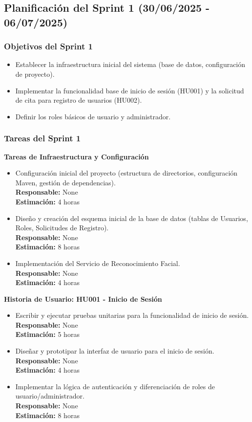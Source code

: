 \documentclass[12pt]{article}
\begin{document}
\subsection{Planificación del Sprint 1 (30/06/2025 - 06/07/2025)}

\subsubsection{Objetivos del Sprint 1}
\begin{itemize}
	\item Establecer la infraestructura inicial del sistema (base de datos, configuración de proyecto).
	\item Implementar la funcionalidad base de inicio de sesión (HU001) y la solicitud de cita para registro de usuarios (HU002).
	\item Definir los roles básicos de usuario y administrador.
\end{itemize}

\subsubsection{Tareas del Sprint 1}
\textbf{Tareas de Infraestructura y Configuración}
\begin{itemize}
	\item Configuración inicial del proyecto (estructura de directorios, configuración Maven, gestión de dependencias). \\
	\textbf{Responsable:} None \\
	\textbf{Estimación:} 4 horas
	\item Diseño y creación del esquema inicial de la base de datos (tablas de Usuarios, Roles, Solicitudes de Registro). \\
	\textbf{Responsable:} None \\
	\textbf{Estimación:} 8 horas
	\item Implementación del Servicio de Reconocimiento Facial. \\
	\textbf{Responsable:} None \\
	\textbf{Estimación:} 4 horas
\end{itemize}

\textbf{Historia de Usuario: HU001 - Inicio de Sesión}
\begin{itemize}
	\item Escribir y ejecutar pruebas unitarias para la funcionalidad de inicio de sesión. \\
	\textbf{Responsable:} None \\
	\textbf{Estimación:} 5 horas
	\item Diseñar y prototipar la interfaz de usuario para el inicio de sesión. \\
	\textbf{Responsable:} None \\
	\textbf{Estimación:} 4 horas
	\item Implementar la lógica de autenticación y diferenciación de roles de usuario/administrador. \\
	\textbf{Responsable:} None \\
	\textbf{Estimación:} 8 horas
\end{itemize}
\end{document}
